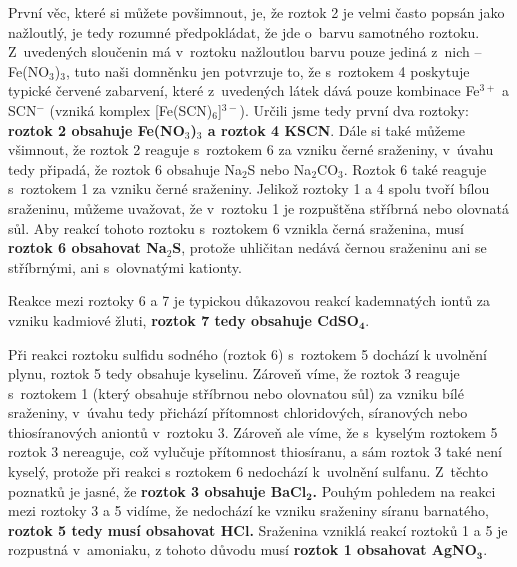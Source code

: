 \documentclass{book}
\begin{document}
První věc, které si můžete povšimnout, je, že roztok 2 je velmi často
popsán jako nažloutlý, je tedy rozumné předpokládat, že jde o~barvu
samotného roztoku. Z~uvedených sloučenin má v~roztoku nažloutlou barvu
pouze jediná z~nich -- Fe(NO$_{3}$)$_{3}$, tuto naši domněnku jen
potvrzuje to, že s~roztokem 4 poskytuje typické červené zabarvení,
které z~uvedených látek dává pouze kombinace Fe$^{3+}$ a SCN$^{-}$
(vzniká komplex {[}Fe(SCN)$_{6}${]}$^{3-}$). Určili jsme tedy první
dva roztoky: \textbf{roztok 2 obsahuje Fe(NO$_{3}$)$_{3}$ a roztok
4 KSCN}. 
\newpage
Dále si také můžeme všimnout, že roztok 2 reaguje s~roztokem 6 za
vzniku černé sraženiny, v~úvahu tedy připadá, že roztok 6 obsahuje
Na$_{2}$S nebo Na$_{2}$CO$_{3}$. Roztok 6 také reaguje s~roztokem
1 za vzniku černé sraženiny. Jelikož roztoky 1 a 4 spolu tvoří bílou
sraženinu, můžeme uvažovat, že v~roztoku 1 je rozpuštěna stříbrná
nebo olovnatá sůl. Aby reakcí tohoto roztoku s~roztokem 6 vznikla
černá sraženina, musí \textbf{roztok 6 obsahovat Na$_{2}$S}, protože
uhličitan nedává černou sraženinu ani se stříbrnými, ani s~olovnatými
kationty.

Reakce mezi roztoky 6 a 7 je typickou důkazovou reakcí kademnatých iontů za vzniku kadmiové
žluti, \textbf{roztok 7 tedy obsahuje CdSO}$_{\boldsymbol{4}}$. 

Při reakci roztoku sulfidu sodného (roztok 6) s~roztokem 5 dochází
k uvolnění plynu, roztok 5 tedy obsahuje kyselinu. Zároveň víme, že
roztok 3 reaguje s~roztokem 1 (který obsahuje stříbrnou nebo olovnatou
sůl) za vzniku bílé sraženiny, v~úvahu tedy přichází přítomnost chloridových,
síranových nebo thiosíranových aniontů v~roztoku 3. Zároveň ale víme,
že s~kyselým roztokem 5 roztok 3 nereaguje, což vylučuje přítomnost
thiosíranu, a sám roztok 3 také není kyselý, protože při reakci s
roztokem 6 nedochází k~uvolnění sulfanu. Z~těchto poznatků je jasné,
že \textbf{roztok 3 obsahuje BaCl}$\boldsymbol{_{2}}$\textbf{.} Pouhým
pohledem na reakci mezi roztoky 3 a 5 vidíme, že nedochází ke vzniku
sraženiny síranu barnatého, \textbf{roztok 5 tedy musí obsahovat HCl.}
Sraženina vzniklá reakcí roztoků 1 a 5 je rozpustná v~amoniaku, z
tohoto důvodu musí \textbf{roztok 1 obsahovat AgNO$\boldsymbol{_{3}}$}.
\end{document}
